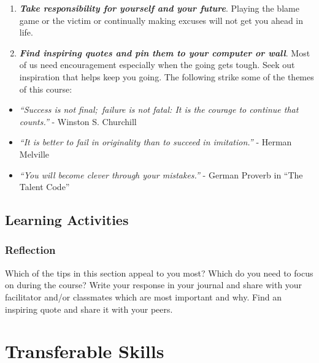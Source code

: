 \documentclass[
]{book}
\begin{document}
\begin{enumerate}
\item
  \textbf{\emph{Take responsibility for yourself and your future}}. Playing the blame game or the victim or continually making excuses will not get you ahead in life.
\item
  \textbf{\emph{Find inspiring quotes and pin them to your computer or wall}}. Most of us need encouragement especially when the going gets tough. Seek out inspiration that helps keep you going. The following strike some of the themes of this course:
\end{enumerate}

\begin{itemize}
\item
  \emph{``Success is not final;~failure is not fatal: It is the courage to continue that counts.''} - Winston S. Churchill
\item
  \emph{``It is better to fail in originality than to succeed in imitation.''} - Herman Melville
\item
  \emph{``You will become clever through your mistakes.''} - German Proverb in ``The Talent Code''
\end{itemize}

\hypertarget{learning-activities-3}{%
\subsection*{Learning Activities}\label{learning-activities-3}}

\begin{reflect}
\hypertarget{reflection}{%
\subsubsection*{Reflection}\label{reflection}}

Which of the tips in this section appeal to you most? Which do you need to focus on during the course? Write your response in your journal and share with your facilitator and/or classmates which are most important and why. Find an inspiring quote and share it with your peers.
\end{reflect}

\hypertarget{transferable-skills}{%
\section{Transferable Skills}\label{transferable-skills}}
\end{document}
